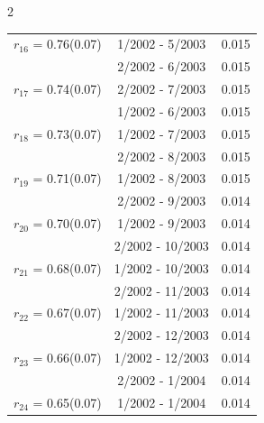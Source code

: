 \begin{multicols}{2}
{\begin{tabular}{ccc}
  $r_{16}$ = 0.76(0.07) &       1/2002 -  5/2003 &        0.015   \vspace{-.10in} \\  
&        2/2002 -  6/2003 &        0.015  \vspace{-.02in} \\ \hline 
  $r_{17}$ = 0.74(0.07) &       2/2002 -  7/2003 &        0.015   \vspace{-.10in} \\  
&        1/2002 -  6/2003 &        0.015  \vspace{-.02in} \\ \hline 
  $r_{18}$ = 0.73(0.07) &       1/2002 -  7/2003 &        0.015   \vspace{-.10in} \\  
&        2/2002 -  8/2003 &        0.015  \vspace{-.02in} \\ \hline 
  $r_{19}$ = 0.71(0.07) &       1/2002 -  8/2003 &        0.015   \vspace{-.10in} \\  
&        2/2002 -  9/2003 &        0.014  \vspace{-.02in} \\ \hline 
  $r_{20}$ = 0.70(0.07) &       1/2002 -  9/2003 &        0.014   \vspace{-.10in} \\  
&        2/2002 - 10/2003 &        0.014  \vspace{-.02in} \\ \hline 
  $r_{21}$ = 0.68(0.07) &       1/2002 - 10/2003 &        0.014   \vspace{-.10in} \\  
&        2/2002 - 11/2003 &        0.014  \vspace{-.02in} \\ \hline 
  $r_{22}$ = 0.67(0.07) &       1/2002 - 11/2003 &        0.014   \vspace{-.10in} \\  
&        2/2002 - 12/2003 &        0.014  \vspace{-.02in} \\ \hline 
  $r_{23}$ = 0.66(0.07) &       1/2002 - 12/2003 &        0.014   \vspace{-.10in} \\  
&        2/2002 -  1/2004 &        0.014  \vspace{-.02in} \\ \hline 
  $r_{24}$ = 0.65(0.07) &       1/2002 -  1/2004 &        0.014   \vspace{-.10in} \\  

\end{tabular}}
\end{multicols}
